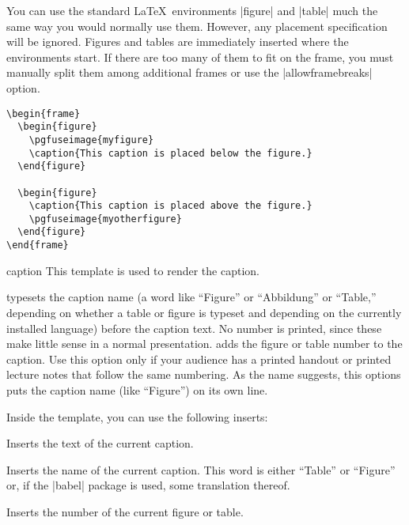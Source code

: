 You can use the standard \LaTeX\ environments |figure| and
|table| much the same way you would normally use them. However,
any placement specification will be ignored. Figures and tables are
immediately inserted where the environments start. If there are too
many of them to fit on the frame, you must manually split them among
additional frames or use the |allowframebreaks| option.

\example
\begin{verbatim}
\begin{frame}
  \begin{figure}
    \pgfuseimage{myfigure}
    \caption{This caption is placed below the figure.}
  \end{figure}

  \begin{figure}
    \caption{This caption is placed above the figure.}
    \pgfuseimage{myotherfigure}
  \end{figure}
\end{frame}
\end{verbatim}

\begin{element}{caption}\yes\yes\yes
  This template is used to render the caption.
  \begin{templateoptions}
    typesets the caption name (a word like ``Figure'' or ``Abbildung''
    or ``Table,'' depending on whether a table or figure is typeset
    and depending on the currently installed language) before the
    caption text. No number is printed, since these make little sense
    in a normal presentation.
    adds the figure or table number to the caption. Use this option
    only if your audience has a printed handout or printed lecture
    notes that follow the same numbering.
    As the name suggests, this options puts the caption name (like
    ``Figure'') on its own line.
  \end{templateoptions}

  Inside the template, you can use the following inserts:
  \begin{itemize}
    \iteminsert{\insertcaption}
    Inserts the text of the current caption.

    \iteminsert{\insertcaptionname}
    Inserts the name of the current caption. This word
    is either ``Table'' or ``Figure'' or, if the |babel| package is
    used, some translation thereof.

    \iteminsert{\insertcaptionnumber}
    Inserts the number of the current figure or table.
  \end{itemize}
\end{element}

